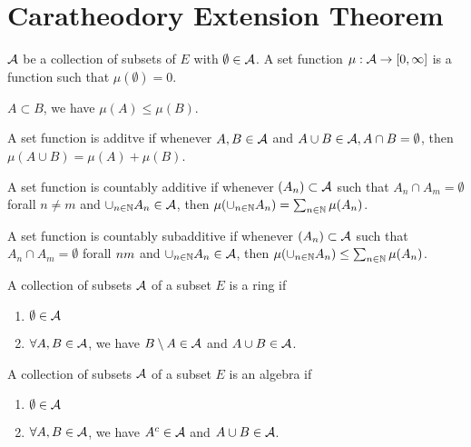\section{Caratheodory Extension Theorem}


\begin{definition}
    $\mathcal{A}$ be a collection of subsets of $E$ with $\emptyset\in\mathcal{A}$.
    A set function $\mu:\mathcal{A}\to [0,\infty]$ is a function such that $\mu(\emptyset)=0$.
\end{definition}

\begin{definition}
    $A\subset B$, we have $\mu(A)\leq \mu(B)$.
\end{definition}

\begin{definition}
    A set function is additve if whenever $A,B\in\mathcal{A}$ and $A\cup B\in\mathcal{A},A\cap B=\emptyset$, then $\mu(A\cup B)=\mu(A)+\mu(B)$.
\end{definition}

\begin{definition}
    A set function is countably additive if whenever $(A_n)\subset\mathcal{A}$ such that $A_n\cap A_m=\emptyset$ forall $n\neq m$ and $\cup_{n\in\mathbb{N}}A_n\in\mathcal{A}$, then $\mu(\cup_{n\in\mathbb{N}}A_n)=\sum_{n\in\mathbb{N}}\mu(A_n)$.
\end{definition}

\begin{definition}
    A set function is countably subadditive if whenever $(A_n)\subset\mathcal{A}$ such that $A_n\cap A_m=\emptyset$ forall $n\empty m$ and $\cup_{n\in\mathbb{N}}A_n\in\mathcal{A}$, then $\mu(\cup_{n\in\mathbb{N}}A_n)\leq\sum_{n\in\mathbb{N}}\mu(A_n)$.
\end{definition}

\begin{definition}[ring]
    A collection of subsets $\mathcal{A}$ of a subset $E$ is a ring if 
    \begin{enumerate}
        \item $\emptyset\in \mathcal{A}$ 
        \item $\forall A,B\in\mathcal{A}$, we have $B\setminus A\in\mathcal{A}$ and $A\cup B\in\mathcal{A}$.
    \end{enumerate}
\end{definition}

\begin{definition}[algebra]
    A collection of subsets $\mathcal{A}$ of a subset $E$ is an algebra if 
    \begin{enumerate}
        \item $\emptyset\in \mathcal{A}$ 
        \item $\forall A,B\in\mathcal{A}$, we have $A^c \in\mathcal{A}$ and $A\cup B\in\mathcal{A}$.
    \end{enumerate}
\end{definition}

